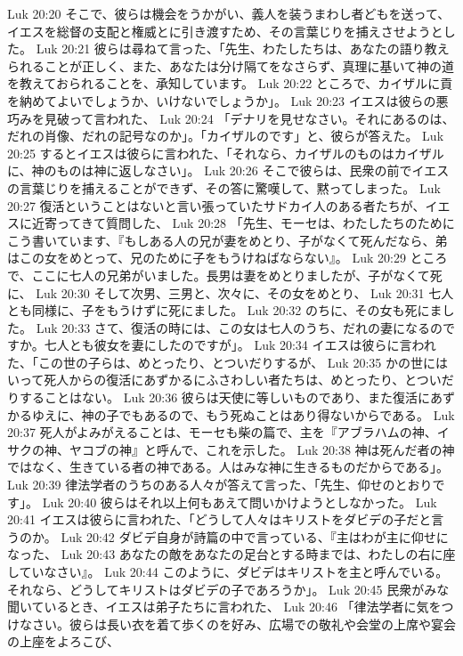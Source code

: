 Luk 20:20  そこで、彼らは機会をうかがい、義人を装うまわし者どもを送って、イエスを総督の支配と権威とに引き渡すため、その言葉じりを捕えさせようとした。
Luk 20:21  彼らは尋ねて言った、「先生、わたしたちは、あなたの語り教えられることが正しく、また、あなたは分け隔てをなさらず、真理に基いて神の道を教えておられることを、承知しています。
Luk 20:22  ところで、カイザルに貢を納めてよいでしょうか、いけないでしょうか」。
Luk 20:23  イエスは彼らの悪巧みを見破って言われた、
Luk 20:24  「デナリを見せなさい。それにあるのは、だれの肖像、だれの記号なのか」。「カイザルのです」と、彼らが答えた。
Luk 20:25  するとイエスは彼らに言われた、「それなら、カイザルのものはカイザルに、神のものは神に返しなさい」。
Luk 20:26  そこで彼らは、民衆の前でイエスの言葉じりを捕えることができず、その答に驚嘆して、黙ってしまった。
Luk 20:27  復活ということはないと言い張っていたサドカイ人のある者たちが、イエスに近寄ってきて質問した、
Luk 20:28  「先生、モーセは、わたしたちのためにこう書いています、『もしある人の兄が妻をめとり、子がなくて死んだなら、弟はこの女をめとって、兄のために子をもうけねばならない』。
Luk 20:29  ところで、ここに七人の兄弟がいました。長男は妻をめとりましたが、子がなくて死に、
Luk 20:30  そして次男、三男と、次々に、その女をめとり、
Luk 20:31  七人とも同様に、子をもうけずに死にました。
Luk 20:32  のちに、その女も死にました。
Luk 20:33  さて、復活の時には、この女は七人のうち、だれの妻になるのですか。七人とも彼女を妻にしたのですが」。
Luk 20:34  イエスは彼らに言われた、「この世の子らは、めとったり、とついだりするが、
Luk 20:35  かの世にはいって死人からの復活にあずかるにふさわしい者たちは、めとったり、とついだりすることはない。
Luk 20:36  彼らは天使に等しいものであり、また復活にあずかるゆえに、神の子でもあるので、もう死ぬことはあり得ないからである。
Luk 20:37  死人がよみがえることは、モーセも柴の篇で、主を『アブラハムの神、イサクの神、ヤコブの神』と呼んで、これを示した。
Luk 20:38  神は死んだ者の神ではなく、生きている者の神である。人はみな神に生きるものだからである」。
Luk 20:39  律法学者のうちのある人々が答えて言った、「先生、仰せのとおりです」。
Luk 20:40  彼らはそれ以上何もあえて問いかけようとしなかった。
Luk 20:41  イエスは彼らに言われた、「どうして人々はキリストをダビデの子だと言うのか。
Luk 20:42  ダビデ自身が詩篇の中で言っている、『主はわが主に仰せになった、
Luk 20:43  あなたの敵をあなたの足台とする時までは、わたしの右に座していなさい』。
Luk 20:44  このように、ダビデはキリストを主と呼んでいる。それなら、どうしてキリストはダビデの子であろうか」。
Luk 20:45  民衆がみな聞いているとき、イエスは弟子たちに言われた、
Luk 20:46  「律法学者に気をつけなさい。彼らは長い衣を着て歩くのを好み、広場での敬礼や会堂の上席や宴会の上座をよろこび、
